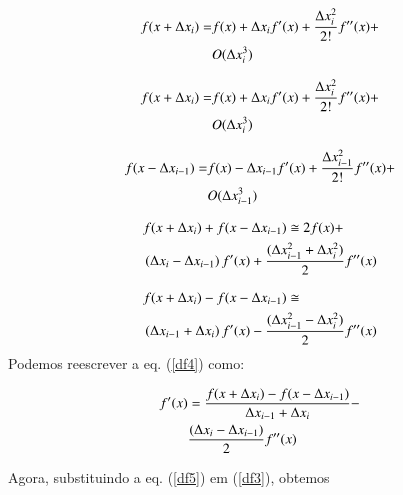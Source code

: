 \begin{align}
f(x+\Delta x_{i}) = & f(x) +\Delta x_{i}f^{\prime }(x) 
+\dfrac{\Delta x_{i}^{2}}{2!}f^{\prime \prime }(x) + \notag \\
& O(\Delta x_{i}^{3}) \label{df0}
\end{align}

\begin{align}
f(x+\Delta x_{i}) = & f(x)+\Delta x_{i}f^{\prime }(x)+
\dfrac{\Delta x_{i}^{2}}{2!}f^{\prime \prime }(x) + \notag \\ 
& O(\Delta x_{i}^{3})  \label{df1}
\end{align}

\begin{align}
f(x-\Delta x_{i-1}) = & f(x)-\Delta x_{i-1}f^{\prime }(x)+
\dfrac{\Delta x_{i-1}^{2}}{2!}f^{\prime \prime }(x) + \notag \\ 
& O(\Delta x_{i-1}^{3})  \label{df2}
\end{align}

\begin{align}
  & f(x+\Delta x_{i}) +f(x-\Delta x_{i-1}) \cong  2f(x) + \notag \\ 
  &\left( \Delta x_{i}-\Delta x_{i-1}\right) f^{\prime }(x) +
 \dfrac{(\Delta x_{i-1}^{2}+\Delta x_{i}^{2})}{2}f^{\prime \prime }(x)  
 \label{df3}
\end{align}

\begin{align}
  & f(x+\Delta x_{i}) - f(x-\Delta x_{i-1})  \cong  \notag \\ 
  & \left( \Delta x_{i-1} + \Delta x_{i} \right) f^{\prime }(x) -
 \dfrac{(\Delta x_{i-1}^{2}-\Delta x_{i}^{2})}{2} f^{\prime \prime }(x) \label{df4}
\end{align}
Podemos reescrever a eq. (\ref{df4}) como:

\begin{align}
f^{\prime }(x) & = \dfrac{f(x+\Delta x_{i})-f(x-\Delta x_{i-1})}{\Delta
x_{i-1}+\Delta x_{i}} - \notag \\ 
 & \dfrac{(\Delta x_{i}-\Delta x_{i-1})}{2}f^{\prime \prime }(x)  \label{df5}
\end{align}

Agora, substituindo a eq. (\ref{df5}) em (\ref{df3}), obtemos


\nocite{Franco2006,Heath1997,Davies-SciAm2006,Castro2001,Bolivar2001}

\nocite{AdvBashScr,BGB2008,Robbins2005,Neves2008,Jargas2008-Shell}
